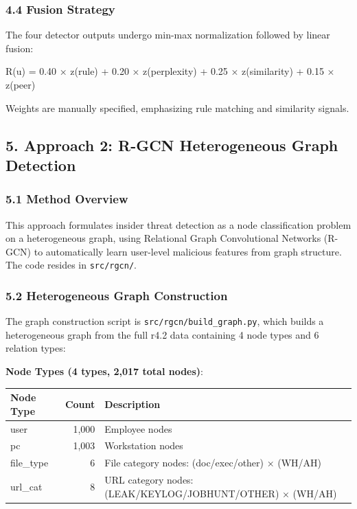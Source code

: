 \documentclass[
  a4paper,
  11pt]{article}
\newenvironment{Shaded}{}{}
\newcommand{\NormalTok}[1]{#1}
\newcounter{none} %
\begin{document}
\subsubsection{4.4 Fusion Strategy}\label{44-fusion-strategy}

The four detector outputs undergo min-max normalization followed by
linear fusion:

\begin{Shaded}
\begin{Highlighting}[]
\NormalTok{R(u) = 0.40 × z(rule) + 0.20 × z(perplexity) + 0.25 × z(similarity) + 0.15 × z(peer)}
\end{Highlighting}
\end{Shaded}

Weights are manually specified, emphasizing rule matching and similarity
signals.

\subsection{5. Approach 2: R-GCN Heterogeneous Graph
Detection}\label{5-approach-2-r-gcn-heterogeneous-graph-detection}

\subsubsection{5.1 Method Overview}\label{51-method-overview}

This approach formulates insider threat detection as a node
classification problem on a heterogeneous graph, using Relational Graph
Convolutional Networks (R-GCN) to automatically learn user-level
malicious features from graph structure. The code resides in
\texttt{src/rgcn/}.

\subsubsection{5.2 Heterogeneous Graph
Construction}\label{52-heterogeneous-graph-construction}

The graph construction script is \texttt{src/rgcn/build\_graph.py},
which builds a heterogeneous graph from the full r4.2 data containing 4
node types and 6 relation types:

\textbf{Node Types (4 types, 2,017 total nodes)}:

{\def\LTcaptype{none} %
\begin{longtable}[]{@{}lrl@{}}
\toprule\noalign{}
Node Type & Count & Description \\
\midrule\noalign{}
\endhead
\bottomrule\noalign{}
\endlastfoot
user & 1,000 & Employee nodes \\
pc & 1,003 & Workstation nodes \\
file\_type & 6 & File category nodes: (doc/exec/other) × (WH/AH) \\
url\_cat & 8 & URL category nodes: (LEAK/KEYLOG/JOBHUNT/OTHER) ×
(WH/AH) \\
\end{longtable}
}
\end{document}
